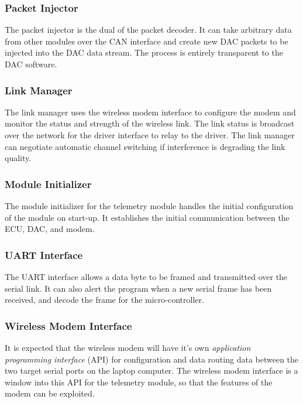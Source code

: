 \subsubsection{Packet Injector}

The packet injector is the dual of the packet decoder. It can take arbitrary data from other modules over the CAN interface and create new DAC packets to be injected into the DAC data stream. The process is entirely transparent to the DAC software.

\subsubsection{Link Manager}

The link manager uses the wireless modem interface to configure the modem and monitor the status and strength of the wireless link. The link status is broadcast over the network for the driver interface to relay to the driver. The link manager can negotiate automatic channel switching if interference is degrading the link quality.

\subsubsection{Module Initializer}

The module initializer for the telemetry module handles the initial configuration of the module on start-up. It establishes the initial communication between the ECU, DAC, and modem. 

\subsubsection{UART Interface}

The UART interface allows a data byte to be framed and transmitted over the serial link. It can also alert the program when a new serial frame has been received, and decode the frame for the micro-controller.

\subsubsection{Wireless Modem Interface}

It is expected that the wireless modem will have it's own \emph{application programming interface} (API) for configuration and data routing data between the two target serial ports on the laptop computer. The wireless modem interface is a window into this API for the telemetry module, so that the features of the modem can be exploited.
